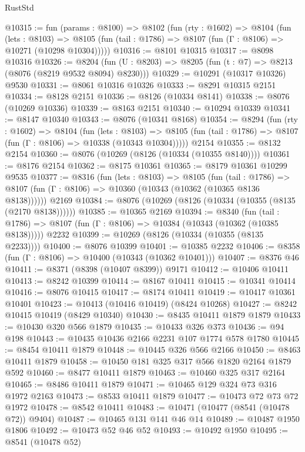 \begin{lexlean}{RustStd}
\begin{coremodule}
@10315 := fun (params : @8100) =>
  @8102
    (fun (rty : @1602) =>
    @8104
      (fun (lets : @8103) =>
      @8105 (fun (tail : @1786) => @8107 (fun (Γ : @8106) => @10271 (@10298 @10304)))))
@10316 := @8101 @10315
@10317 := @8098 @10316
@10326 := @8204 (fun (U : @8203) => @8205 (fun (t : @7) => @8213 (@8076 (@8219 @9532 @8094) @8230)))
@10329 := @10291 (@10317 @10326) @9530
@10331 := @8061 @10316 @10326
@10333 := @8291 @10315 @2151
@10334 := @8128 @2151
@10336 := @8126 (@10334 @8141)
@10338 := @8076 (@10269 @10336)
@10339 := @8163 @2151
@10340 := @10294 @10339
@10341 := @8147 @10340
@10343 := @8076 (@10341 @8168)
@10354 := @8294
    (fun (rty : @1602) =>
    @8104
      (fun (lets : @8103) =>
      @8105 (fun (tail : @1786) => @8107 (fun (Γ : @8106) => @10338 (@10343 @10304)))))
    @2154
@10355 := @8132 @2154
@10360 := @8076 (@10269 (@8126 (@10334 (@10355 @8140))))
@10361 := @8176 @2154
@10362 := @8175 @10361
@10365 := @8179 @10361 @10299 @9535
@10377 := @8316
    (fun (lets : @8103) =>
    @8105
      (fun (tail : @1786) =>
      @8107 (fun (Γ : @8106) => @10360 (@10343 (@10362 (@10365 @8136 @8138))))))
    @2169
@10384 := @8076 (@10269 (@8126 (@10334 (@10355 (@8135 (@2170 @8138))))))
@10385 := @10365 @2169
@10394 := @8340
    (fun (tail : @1786) => @8107 (fun (Γ : @8106) => @10384 (@10343 (@10362 (@10385 @8138)))))
    @2232
@10399 := @10269 (@8126 (@10334 (@10355 (@8135 @2233))))
@10400 := @8076 @10399
@10401 := @10385 @2232
@10406 := @8358 (fun (Γ : @8106) => @10400 (@10343 (@10362 @10401)))
@10407 := @8376 @46
@10411 := @8371 (@8398 (@10407 @8399)) @9171
@10412 := @10406 @10411
@10413 := @8242 @10399
@10414 := @8167 @10411
@10415 := @10341 @10414
@10416 := @8076 @10415
@10417 := @8174 @10411
@10419 := @10417 @10361 @10401
@10423 := @10413 (@10416 @10419) (@8424 @10268)
@10427 := @8242 @10415 @10419 (@8429 @10340)
@10430 := @8435 @10411 @1879 @1879
@10433 := @10430 @320 @566 @1879
@10435 := @10433 @326 @373
@10436 := @94 @198
@10443 := @10435 @10436 @2166 @2231 @107 @1774 @578 @1780
@10445 := @8454 @10411 @1879
@10448 := @10445 @326 @566 @2166
@10450 := @8463 @10411 @1879
@10458 := @10450 @181 @325 @317 @566 @1820 @2164 @1879 @592
@10460 := @8477 @10411 @1879
@10463 := @10460 @325 @317 @2164
@10465 := @8486 @10411 @1879
@10471 := @10465 @129 @324 @73 @316 @1972 @2163
@10473 := @8533 @10411 @1879
@10477 := @10473 @72 @73 @72 @1972
@10478 := @8542 @10411
@10483 := @10471 (@10477 (@8541 (@10478 @72)) @9404)
@10487 := @10465 @131 @141 @46 @14
@10489 := @10487 @1950 @1806
@10492 := @10473 @52 @46 @52
@10493 := @10492 @1950
@10495 := @8541 (@10478 @52)

\end{coremodule}
\end{lexlean}
